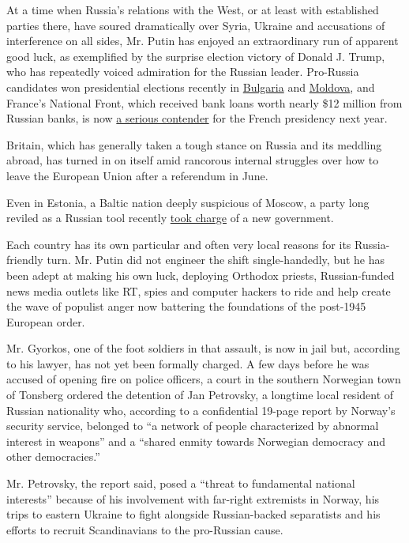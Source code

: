 At a time when Russia's relations with the West, or at least with
established parties there, have soured dramatically over Syria, Ukraine
and accusations of interference on all sides, Mr. Putin has enjoyed an
extraordinary run of apparent good luck, as exemplified by the surprise
election victory of Donald J. Trump, who has repeatedly voiced
admiration for the Russian leader. Pro-Russia candidates won
presidential elections recently in
\href{http://www.nytimes.com/2016/11/14/world/europe/pro-russia-candidate-appears-likely-to-win-bulgarian-presidency.html}{Bulgaria}
and
\href{http://www.nytimes.com/2016/10/31/world/europe/moldova-presidential-election-igo-dodon.html}{Moldova},
and France's National Front, which received bank loans worth nearly \$12
million from Russian banks, is now
\href{http://www.nytimes.com/2016/12/17/world/europe/european-union-france-frexit-marine-le-pen.html}{a
serious contender} for the French presidency next year.

Britain, which has generally taken a tough stance on Russia and its
meddling abroad, has turned in on itself amid rancorous internal
struggles over how to leave the European Union after a referendum in
June.

Even in Estonia, a Baltic nation deeply suspicious of Moscow, a party
long reviled as a Russian tool recently
\href{http://www.nytimes.com/2016/11/21/world/europe/estonia-juri-ratas-center-party.html}{took
charge} of a new government.

Each country has its own particular and often very local reasons for its
Russia-friendly turn. Mr. Putin did not engineer the shift
single-handedly, but he has been adept at making his own luck, deploying
Orthodox priests, Russian-funded news media outlets like RT, spies and
computer hackers to ride and help create the wave of populist anger now
battering the foundations of the post-1945 European order.

Mr. Gyorkos, one of the foot soldiers in that assault, is now in jail
but, according to his lawyer, has not yet been formally charged. A few
days before he was accused of opening fire on police officers, a court
in the southern Norwegian town of Tonsberg ordered the detention of Jan
Petrovsky, a longtime local resident of Russian nationality who,
according to a confidential 19-page report by Norway's security service,
belonged to ``a network of people characterized by abnormal interest in
weapons'' and a ``shared enmity towards Norwegian democracy and other
democracies.''

Mr. Petrovsky, the report said, posed a ``threat to fundamental national
interests'' because of his involvement with far-right extremists in
Norway, his trips to eastern Ukraine to fight alongside Russian-backed
separatists and his efforts to recruit Scandinavians to the pro-Russian
cause.

